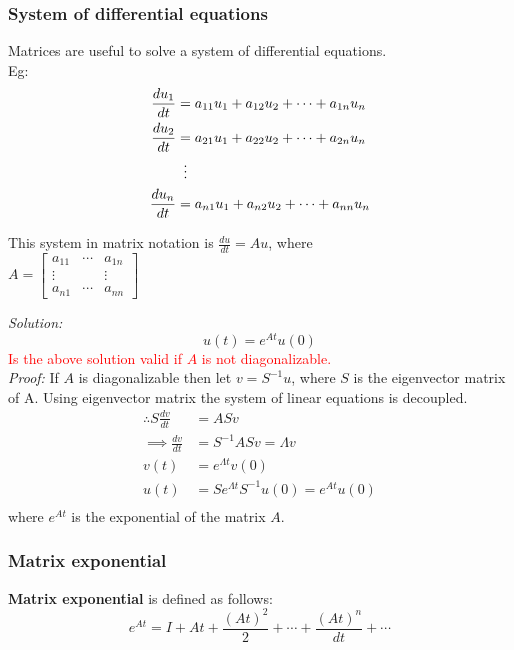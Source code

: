 \subsubsection{System of differential equations}
Matrices are useful to solve a system of differential equations.\\
Eg:
\begin{align*}
\frac{du_1}{dt} &= a_{11}u_1 + a_{12}u_2 + \cdots + a_{1n}u_n\\
\frac{du_2}{dt} &= a_{21}u_1 + a_{22}u_2 + \cdots + a_{2n}u_n\\
&\vdotswithin{=}\\
\frac{du_n}{dt} &= a_{n1}u_1 + a_{n2}u_2 + \cdots + a_{nn}u_n\\
\end{align*}

This system in matrix notation is $\frac{du}{dt} = Au$, where\\
$A = 
\begin{bmatrix}
a_{11} & \cdots & a_{1n}\\
\vdots & & \vdots\\
a_{n1} & \cdots & a_{nn}	
\end{bmatrix}
$

\textit{Solution:}\\
$$u(t) = e^{At}u(0)$$
\textcolor{red}{Is the above solution valid if $A$ is not diagonalizable.}\\
\textit{Proof:}
If $A$ is diagonalizable then let $v = S^{-1}u$, where $S$ is the eigenvector matrix of A. Using eigenvector matrix the system of linear equations is decoupled.\\ 
\begin{align*}
\therefore S\frac{dv}{dt} &= ASv\\
\implies \frac{dv}{dt} &= S^{-1}ASv = \Lambda v\\
v(t) &= e^{\Lambda t}v(0)\\
u(t) &= Se^{\Lambda t}S^{-1}u(0) = e^{At}u(0)\\
\end{align*}
where $e^{At}$ is the exponential of the matrix $A$.\\




\subsubsection{Matrix exponential}

\textbf{Matrix exponential} is defined as follows:\\
$$e^{At} = I + At + \frac{(At)^{2}}{2} + \cdots + \frac{(At)^n}{dt} + \cdots$$\\

